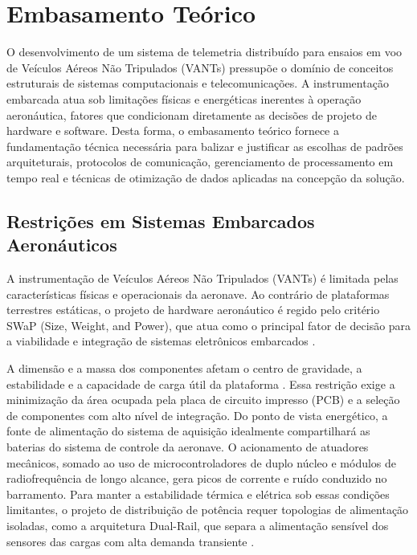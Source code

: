 \chapter{Embasamento Teórico}
\label{cap:embasamento-teorico}
O desenvolvimento de um sistema de telemetria distribuído para ensaios em voo de Veículos Aéreos Não Tripulados (VANTs) pressupõe o domínio de conceitos estruturais de sistemas computacionais e telecomunicações. A instrumentação embarcada atua sob limitações físicas e energéticas inerentes à operação aeronáutica, fatores que condicionam diretamente as decisões de projeto de hardware e software. Desta forma, o embasamento teórico fornece a fundamentação técnica necessária para balizar e justificar as escolhas de padrões arquiteturais, protocolos de comunicação, gerenciamento de processamento em tempo real e técnicas de otimização de dados aplicadas na concepção da solução.

\section{Restrições em Sistemas Embarcados Aeronáuticos}
A instrumentação de Veículos Aéreos Não Tripulados (VANTs) é limitada pelas características físicas e operacionais da aeronave. Ao contrário de plataformas terrestres estáticas, o projeto de hardware aeronáutico é regido pelo critério SWaP (Size, Weight, and Power), que atua como o principal fator de decisão para a viabilidade e integração de sistemas eletrônicos embarcados \cite{raymer_aircraft_design}.

A dimensão e a massa dos componentes afetam o centro de gravidade, a estabilidade e a capacidade de carga útil da plataforma \cite{raymer_aircraft_design}. Essa restrição exige a minimização da área ocupada pela placa de circuito impresso (PCB) e a seleção de componentes com alto nível de integração. Do ponto de vista energético, a fonte de alimentação do sistema de aquisição idealmente compartilhará as baterias do sistema de controle da aeronave. O acionamento de atuadores mecânicos, somado ao uso de microcontroladores de duplo núcleo e módulos de radiofrequência de longo alcance, gera picos de corrente e ruído conduzido no barramento. Para manter a estabilidade térmica e elétrica sob essas condições limitantes, o projeto de distribuição de potência requer topologias de alimentação isoladas, como a arquitetura Dual-Rail, que separa a alimentação sensível dos sensores das cargas com alta demanda transiente \cite{the_art_of_electronics}.

